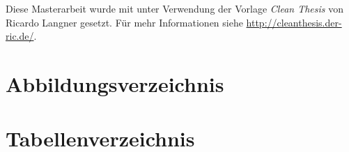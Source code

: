 
{%
\renewcommand{\bibfont}{\normalfont\small}
\setlength{\biblabelsep}{0pt}
\setlength{\bibitemsep}{0.5\baselineskip plus 0.5\baselineskip}
\printbibliography
}

\vfill

Diese Masterarbeit wurde mit \LaTeXe unter Verwendung der Vorlage \textit{Clean Thesis} von Ricardo Langner gesetzt.
Für mehr Informationen siehe \url{http://cleanthesis.der-ric.de/}.

\cleardoublepage

\chapter*{Abbildungsverzeichnis}
\renewcommand\listfigurename{}
\vspace*{-2.35cm}
\listoffigures
\cleardoublepage

\chapter*{Tabellenverzeichnis}
\renewcommand\listtablename{}
\vspace*{-2.35cm}
\listoftables
\cleardoublepage

\renewcommand\listalgorithmname{Algorithmenverzeichnis}
\listofalgorithms
\cleardoublepage


